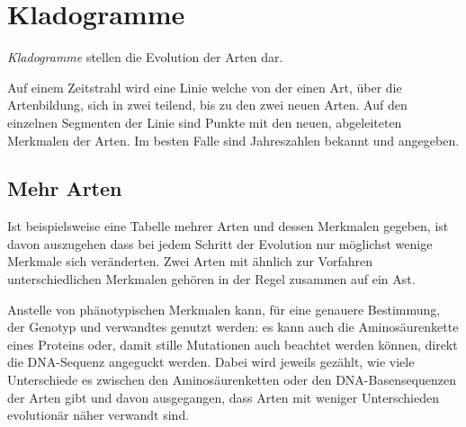 \documentclass{article}
\begin{document}
\section{Kladogramme}
\emph{Kladogramme} stellen die Evolution der Arten dar.
 
Auf einem Zeitstrahl wird eine Linie welche von der einen Art, über die Artenbildung, sich in zwei teilend, bis zu den zwei neuen Arten. Auf den einzelnen Segmenten der Linie sind Punkte mit den neuen, abgeleiteten Merkmalen der Arten. Im besten Falle sind Jahreszahlen bekannt und angegeben.
 
\begin{center}
\end{center}
 
\subsection{Mehr Arten} 
Ist beispielsweise eine Tabelle mehrer Arten und dessen Merkmalen gegeben, ist davon auszugehen dass bei jedem Schritt der Evolution nur möglichst wenige Merkmale sich veränderten. Zwei Arten mit ähnlich zur Vorfahren unterschiedlichen Merkmalen gehören in der Regel zusammen auf ein Ast. 
 
Anstelle von phänotypischen Merkmalen kann, für eine genauere Bestimmung, der Genotyp und verwandtes genutzt werden: es kann auch die Aminosäurenkette eines Proteins oder, damit stille Mutationen auch beachtet werden können, direkt die DNA-Sequenz angeguckt werden. Dabei wird jeweils gezählt, wie viele Unterschiede es zwischen den Aminosäurenketten oder den DNA-Basensequenzen der Arten gibt und davon ausgegangen, dass Arten mit weniger Unterschieden evolutionär näher verwandt sind.
\end{document}
